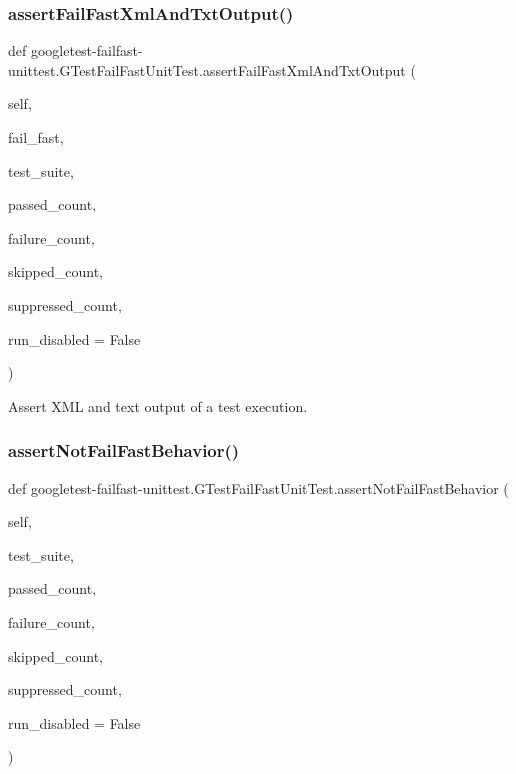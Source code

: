 \subsubsection{\texorpdfstring{assert\+Fail\+Fast\+Xml\+And\+Txt\+Output()}{assertFailFastXmlAndTxtOutput()}}
{\footnotesize\ttfamily def googletest-\/failfast-\/unittest.\+G\+Test\+Fail\+Fast\+Unit\+Test.\+assert\+Fail\+Fast\+Xml\+And\+Txt\+Output (\begin{DoxyParamCaption}\item[{}]{self,  }\item[{}]{fail\+\_\+fast,  }\item[{}]{test\+\_\+suite,  }\item[{}]{passed\+\_\+count,  }\item[{}]{failure\+\_\+count,  }\item[{}]{skipped\+\_\+count,  }\item[{}]{suppressed\+\_\+count,  }\item[{}]{run\+\_\+disabled = {\ttfamily False} }\end{DoxyParamCaption})}

\begin{DoxyVerb}Assert XML and text output of a test execution.\end{DoxyVerb}
 \mbox{\label{classgoogletest-failfast-unittest_1_1GTestFailFastUnitTest_a7c2f4c49ee6ff969b7373a3cec08ffe2}} 
\subsubsection{\texorpdfstring{assert\+Not\+Fail\+Fast\+Behavior()}{assertNotFailFastBehavior()}}
{\footnotesize\ttfamily def googletest-\/failfast-\/unittest.\+G\+Test\+Fail\+Fast\+Unit\+Test.\+assert\+Not\+Fail\+Fast\+Behavior (\begin{DoxyParamCaption}\item[{}]{self,  }\item[{}]{test\+\_\+suite,  }\item[{}]{passed\+\_\+count,  }\item[{}]{failure\+\_\+count,  }\item[{}]{skipped\+\_\+count,  }\item[{}]{suppressed\+\_\+count,  }\item[{}]{run\+\_\+disabled = {\ttfamily False} }\end{DoxyParamCaption})}

